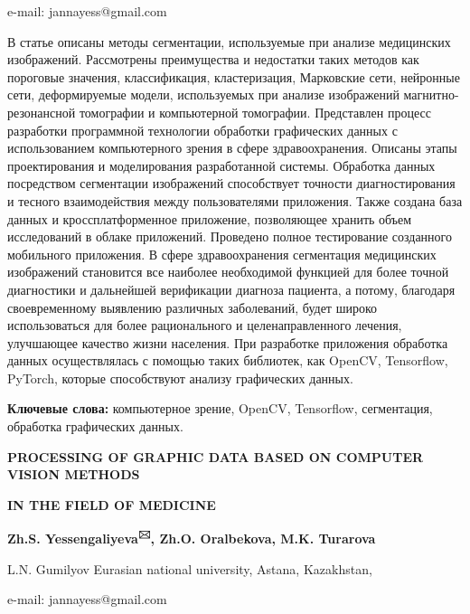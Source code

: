 e-mail: jannayess@gmail.com

В статье описаны методы сегментации, используемые при анализе
медицинских изображений. Рассмотрены преимущества и недостатки таких
методов как пороговые значения, классификация, кластеризация, Марковские
сети, нейронные сети, деформируемые модели, используемых при анализе
изображений магнитно-резонансной томографии и компьютерной томографии.
Представлен процесс разработки программной технологии обработки
графических данных с использованием компьютерного зрения в сфере
здравоохранения. Описаны этапы проектирования и моделирования
разработанной системы. Обработка данных посредством сегментации
изображений способствует точности диагностирования и тесного
взаимодействия между пользователями приложения. Также создана база
данных и кроссплатформенное приложение, позволяющее хранить объем
исследований в облаке приложений. Проведено полное тестирование
созданного мобильного приложения. В сфере здравоохранения сегментация
медицинских изображений становится все наиболее необходимой функцией для
более точной диагностики и дальнейшей верификации диагноза пациента, а
потому, благодаря своевременному выявлению различных заболеваний, будет
широко использоваться для более рационального и целенаправленного
лечения, улучшающее качество жизни населения. При разработке приложения
обработка данных осуществлялась с помощью таких библиотек, как OpenCV,
Tensorflow, PyTorch, которые способствуют анализу графических данных.

{\bfseries Ключевые слова:} компьютерное зрение, OpenCV, Tensorflow,
сегментация, обработка графических данных.

{\bfseries PROCESSING OF GRAPHIC DATA BASED ON COMPUTER VISION METHODS}

{\bfseries IN THE FIELD OF MEDICINE}

{\bfseries Zh.S. Yessengaliyeva\textsuperscript{🖂}, Zh.O. Oralbekova, M.K.
Turarova}

L.N. Gumilyov Eurasian national university, Astana, Kazakhstan,

e-mail: jannayess@gmail.com

